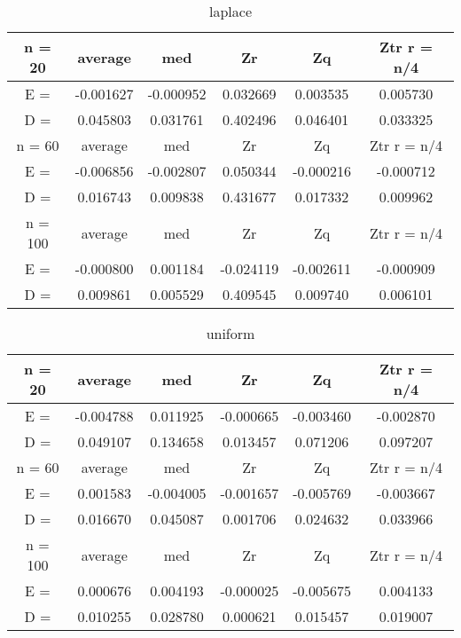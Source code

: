 \documentclass[12pt]{article}
\begin{document}
\begin{table}[H]
\caption{laplace}
\label{tab:my_label3}
\begin{center}
\vspace{5mm}
\begin{tabular}{|c|c|c|c|c|c|}
\hline
n = 20    &average     &med         &Zr          &Zq          &Ztr r = n/4 \\
\hline
E =       &-0.001627   &-0.000952   &0.032669    &0.003535    &0.005730    \\
\hline
D =       &0.045803    &0.031761    &0.402496    &0.046401    &0.033325    \\
\hline
n = 60    &average     &med         &Zr          &Zq          &Ztr r = n/4 \\
\hline
E =       &-0.006856   &-0.002807   &0.050344    &-0.000216   &-0.000712   \\
\hline
D =       &0.016743    &0.009838    &0.431677    &0.017332    &0.009962    \\
\hline
n = 100   &average     &med         &Zr          &Zq          &Ztr r = n/4 \\
\hline
E =       &-0.000800   &0.001184    &-0.024119   &-0.002611   &-0.000909   \\
\hline
D =       &0.009861    &0.005529    &0.409545    &0.009740    &0.006101    \\
\hline
\end{tabular}
\end{center}
\end{table}

\begin{table}[H]
\caption{uniform}
\label{tab:my_label4}
\begin{center}
\vspace{5mm}
\begin{tabular}{|c|c|c|c|c|c|}
\hline
n = 20    &average     &med         &Zr          &Zq          &Ztr r = n/4 \\
\hline
E =       &-0.004788   &0.011925    &-0.000665   &-0.003460   &-0.002870   \\
\hline
D =       &0.049107    &0.134658    &0.013457    &0.071206    &0.097207    \\
\hline
n = 60    &average     &med         &Zr          &Zq          &Ztr r = n/4 \\
\hline
E =       &0.001583    &-0.004005   &-0.001657   &-0.005769   &-0.003667   \\
\hline
D =       &0.016670    &0.045087    &0.001706    &0.024632    &0.033966    \\
\hline
n = 100   &average     &med         &Zr          &Zq          &Ztr r = n/4 \\
\hline
E =       &0.000676    &0.004193    &-0.000025   &-0.005675   &0.004133    \\
\hline
D =       &0.010255    &0.028780    &0.000621    &0.015457    &0.019007    \\
\hline
\end{tabular}
\end{center}
\end{table}
\end{document}
